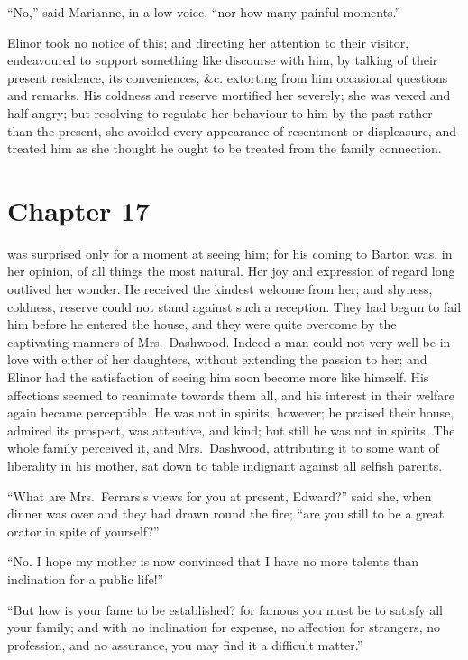 ``No,'' said Marianne, in a low voice, ``nor how many
painful moments.''

Elinor took no notice of this; and directing
her attention to their visitor, endeavoured to support
something like discourse with him, by talking of their
present residence, its conveniences, \&c. extorting from him
occasional questions and remarks.  His coldness and reserve
mortified her severely; she was vexed and half angry;
but resolving to regulate her behaviour to him by the past
rather than the present, she avoided every appearance
of resentment or displeasure, and treated him as she
thought he ought to be treated from the family connection.



\chapter{Chapter 17}


 was surprised only for a moment at
seeing him; for his coming to Barton was, in her opinion,
of all things the most natural.  Her joy and expression
of regard long outlived her wonder.  He received the kindest
welcome from her; and shyness, coldness, reserve could not
stand against such a reception.  They had begun to fail him
before he entered the house, and they were quite overcome
by the captivating manners of Mrs.\ Dashwood.  Indeed a man
could not very well be in love with either of her daughters,
without extending the passion to her; and Elinor had the
satisfaction of seeing him soon become more like himself.
His affections seemed to reanimate towards them all,
and his interest in their welfare again became perceptible.
He was not in spirits, however; he praised their house,
admired its prospect, was attentive, and kind; but still
he was not in spirits.  The whole family perceived it,
and Mrs.\ Dashwood, attributing it to some want of liberality
in his mother, sat down to table indignant against all
selfish parents.

``What are Mrs.\ Ferrars's views for you at present, Edward?''
said she, when dinner was over and they had drawn round
the fire; ``are you still to be a great orator in spite of
yourself?''

``No. I hope my mother is now convinced that I have
no more talents than inclination for a public life!''

``But how is your fame to be established? for famous you
must be to satisfy all your family; and with no inclination
for expense, no affection for strangers, no profession,
and no assurance, you may find it a difficult matter.''


